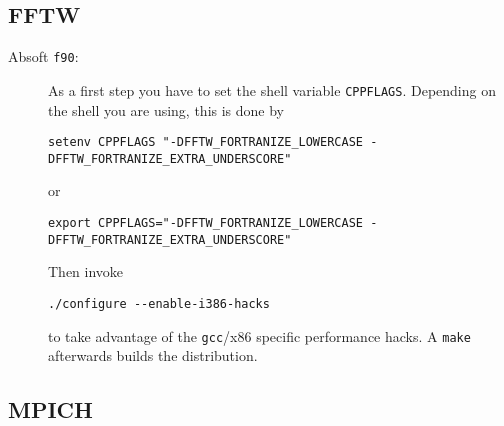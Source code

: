 \documentclass[a4paper,10pt]{article}
\begin{document}
\subsection{FFTW}

\begin{description}
\item[Absoft \texttt{f90}:] As a first step you have to set the shell variable
\texttt{CPPFLAGS}. Depending on the shell you are using, this is done by
{\footnotesize
\begin{verbatim}
setenv CPPFLAGS "-DFFTW_FORTRANIZE_LOWERCASE -DFFTW_FORTRANIZE_EXTRA_UNDERSCORE"
\end{verbatim}
}
or
{\footnotesize
\begin{verbatim}
export CPPFLAGS="-DFFTW_FORTRANIZE_LOWERCASE -DFFTW_FORTRANIZE_EXTRA_UNDERSCORE"
\end{verbatim}
}
Then invoke
\begin{verbatim}
./configure --enable-i386-hacks
\end{verbatim}
to take advantage of the \texttt{gcc}/x86 specific performance hacks. A
\texttt{make} afterwards builds the distribution.


\end{description}

\subsection{MPICH}
\end{document}
